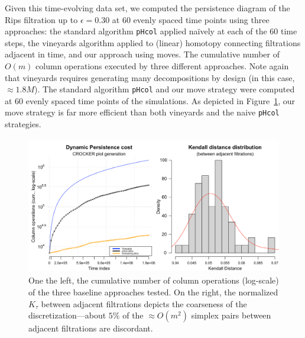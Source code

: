 \documentclass[sn-mathphys]{sn-jnl}
\begin{document}
Given this time-evolving data set, we computed the persistence diagram of the Rips filtration up to $\epsilon = 0.30$ at 60 evenly spaced time points using three approaches: the standard algorithm \texttt{pHcol} applied naïvely at each of the 60 time steps, the vineyards algorithm applied to (linear) homotopy connecting filtrations adjacent in time, and our approach using moves.   
The cumulative number of $O(m)$ column operations executed by three different approaches. Note again that vineyards requires generating many decompositions by design (in this case, $\approx 1.8M$). The standard algorithm \texttt{pHcol} and our move strategy were computed at 60 evenly spaced time points of the simulations. As depicted in Figure~\ref{fig:boid_sim_results}, our move strategy is far more efficient than both vineyards and the naive \texttt{pHcol} strategies. 

\begin{figure}[ht]
	\centering
	\includegraphics[width=\textwidth, height=16.15em]{boid_sim_results.png}
	\caption{ One the left, the cumulative number of column operations (log-scale) of the three baseline approaches tested. On the right, the normalized $K_\tau$ between adjacent filtrations depicts the coarseness of the discretization---about $5\%$ of the $\approx O(m^2)$ simplex pairs between adjacent filtrations are discordant.}
	\label{fig:boid_sim_results}
\end{figure}
\end{document}
